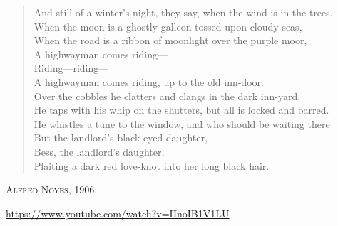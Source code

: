 \begin{verse}
And still of a winter's night, they say, when the wind is in the trees,\\
When the moon is a ghostly galleon tossed upon cloudy seas,\\
When the road is a ribbon of moonlight over the purple moor,\\
A highwayman comes riding---\\
Riding---riding---\\
A highwayman comes riding, up to the old inn-door.\\
Over the cobbles he clatters and clangs in the dark inn-yard.\\
He taps with his whip on the shutters, but all is locked and barred.\\
He whistles a tune to the window, and who should be waiting there\\
But the landlord's black-eyed daughter,\\
Bess, the landlord's daughter,\\
Plaiting a dark red love-knot into her long black hair.
\end{verse}

\textsc{Alfred Noyes}, 1906

\url{https://www.youtube.com/watch?v=IInoIB1V1LU} 


